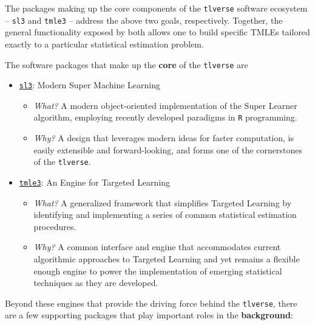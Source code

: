 \documentclass[
  12pt, krantz2,
]{krantz}
\newcommand{\passthrough}[1]{#1}
\providecommand{\tightlist}{%
  \setlength{\itemsep}{0pt}\setlength{\parskip}{0pt}}
\newcommand{\1}{\mathbbm{1}}
\theoremstyle{definition}
\theoremstyle{definition}
\theoremstyle{definition}
\theoremstyle{definition}
\theoremstyle{remark}
\begin{document}
The packages making up the core components of the \passthrough{\lstinline!tlverse!} software ecosystem
-- \passthrough{\lstinline!sl3!} and \passthrough{\lstinline!tmle3!} -- address the above two goals, respectively. Together, the
general functionality exposed by both allows one to build specific TMLEs
tailored exactly to a particular statistical estimation problem.

The software packages that make up the \textbf{core} of the \passthrough{\lstinline!tlverse!} are

\begin{itemize}
\tightlist
\item
  \href{https://github.com/tlverse/sl3}{\passthrough{\lstinline!sl3!}}: Modern Super Machine Learning

  \begin{itemize}
  \tightlist
  \item
    \emph{What?} A modern object-oriented implementation of the Super Learner
    algorithm, employing recently developed paradigms in \passthrough{\lstinline!R!} programming.
  \item
    \emph{Why?} A design that leverages modern ideas for faster computation, is
    easily extensible and forward-looking, and forms one of the cornerstones of
    the \passthrough{\lstinline!tlverse!}.
  \end{itemize}
\item
  \href{https://github.com/tlverse/tmle3}{\passthrough{\lstinline!tmle3!}}: An Engine for Targeted Learning

  \begin{itemize}
  \tightlist
  \item
    \emph{What?} A generalized framework that simplifies Targeted Learning by
    identifying and implementing a series of common statistical estimation
    procedures.
  \item
    \emph{Why?} A common interface and engine that accommodates current algorithmic
    approaches to Targeted Learning and yet remains a flexible enough engine to
    power the implementation of emerging statistical techniques as they are
    developed.
  \end{itemize}
\end{itemize}

Beyond these engines that provide the driving force behind the \passthrough{\lstinline!tlverse!}, there
are a few supporting packages that play important roles in the \textbf{background}:
\end{document}
